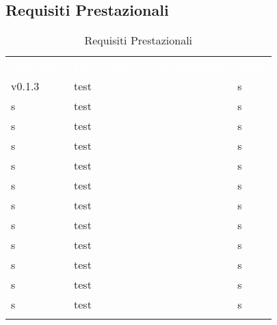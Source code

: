 \subsection{Requisiti Prestazionali}




\renewcommand{\arraystretch}{1.5}
\begin{longtable}{ m{}<{\centering}  m{}<{\centering}  m{}<{\centering}  m{}<{\centering}}
	\rowcolor{darkblue}
	\textcolor{white}{\textbf{Requisito}} &\textcolor{white}{\textbf{Descrizione}}& \textcolor{white}{\textbf{Classificazione}} & \textcolor{white}{\textbf{Fonti}}\\ 

	v0.1.3 & test & \Ob & s\\	

	\rowcolor{gray!25} s & test & \Ob & s\\	
	 
	 s & test & \Ob & s\\	

	\rowcolor{gray!25} s & test & \Ob & s\\	
	 
	 s & test & \Ob & s\\	
	 
	\rowcolor{gray!25} s & test & \Ob & s\\	
	 
	 s & test & \Ob & s\\	
	 
	\rowcolor{gray!25} s & test & \Ob & s\\	

	 s & test & \Ob & s\\	
	 
	\rowcolor{gray!25} s & test & \Ob & s\\	
	 
	 s & test & \Ob & s\\	
	 
	\rowcolor{gray!25} s & test & \Ob & s\\	

	\caption{Requisiti Prestazionali}
\end{longtable}